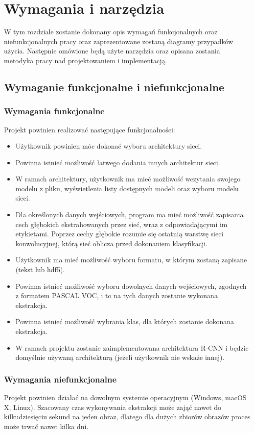 \documentclass[a4paper,twoside,12pt]{book}
\begin{document}
{ 
\chapter{Wymagania i narzędzia}
{W tym rozdziale zostanie dokonany opis wymagań funkcjonalnych oraz niefunkcjonalnych pracy oraz zaprezentowane zostaną diagramy przypadków użycia. Następnie omówione będą użyte narzędzia oraz opisana zostania metodyka pracy nad projektowaniem i implementacją.}
\section{Wymaganie funkcjonalne i niefunkcjonalne}
\subsection{Wymagania funkcjonalne}
{Projekt powinien realizować następujące funkcjonalności:
\begin{itemize}
\item{Użytkownik powinien móc dokonać wyboru architektury sieci.}
 \item {Powinna istnieć możliwość łatwego dodania innych architektur sieci.}
 \item{W ramach architektury, użytkownik ma mieć możliwość wczytania swojego modelu z pliku, wyświetlenia listy dostępnych modeli oraz wyboru modelu sieci.}
  \item {Dla określonych danych wejściowych, program ma mieć możliwość zapisania cech głębokich ekstrahowanych przez sieć, wraz z odpowiadającymi im etykietami. Poprzez cechy głębokie rozumie się ostatnią warstwę sieci konwolucyjnej, którą sieć oblicza przed dokonaniem klasyfikacji. }
  \item{Użytkownik ma mieć możliwość wyboru formatu, w którym zostaną zapisane (tekst lub hdf5).}
  \item{Powinna istnieć możliwość wyboru dowolnych danych wejściowych, zgodnych z formatem PASCAL VOC, i to na tych danych zostanie wykonana ekstrakcja.}
  \item{Powinna istnieć możliwość wybrania klas, dla których zostanie dokonana ekstrakcja.}
  \item{W ramach projektu zostanie zaimplementowana architektura R-CNN i będzie domyślnie używaną architekturą (jeżeli użytkownik nie wskaże innej).}
\end{itemize}}
\subsection{Wymagania niefunkcjonalne}
{Projekt powinien działać na dowolnym systemie operacyjnym (Windows, macOS X, Linux). Szacowany czas wykonywania ekstrakcji może zająć nawet do kilkudziesięciu sekund na jeden obraz, dlatego dla dużych zbiorów obrazów proces może trwać nawet kilka dni. }
}
\end{document}
